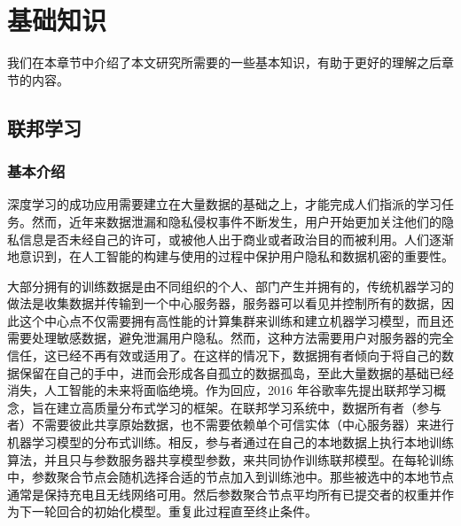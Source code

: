 \chapter{基础知识}
\label{ch2}
我们在本章节中介绍了本文研究所需要的一些基本知识，有助于更好的理解之后章节的内容。

\section{联邦学习}

\subsection{基本介绍}
深度学习的成功应用需要建立在大量数据的基础之上，才能完成人们指派的学习任务。然而，近年来数据泄漏和隐私侵权事件不断发生，用户开始更加关注他们的隐私信息是否未经自己的许可，或被他人出于商业或者政治目的而被利用。人们逐渐地意识到，在人工智能的构建与使用的过程中保护用户隐私和数据机密的重要性。

大部分拥有的训练数据是由不同组织的个人、部门产生并拥有的，传统机器学习的做法是收集数据并传输到一个中心服务器，服务器可以看见并控制所有的数据，因此这个中心点不仅需要拥有高性能的计算集群来训练和建立机器学习模型，而且还需要处理敏感数据，避免泄漏用户隐私。然而，这种方法需要用户对服务器的完全信任，这已经不再有效或适用了。在这样的情况下，数据拥有者倾向于将自己的数据保留在自己的手中，进而会形成各自孤立的数据孤岛，至此大量数据的基础已经消失，人工智能的未来将面临绝境。作为回应，2016 年谷歌\cite{ref25}率先提出联邦学习概念，旨在建立高质量分布式学习的框架。在联邦学习系统中，数据所有者（参与者）不需要彼此共享原始数据，也不需要依赖单个可信实体（中心服务器）来进行机器学习模型的分布式训练。相反，参与者通过在自己的本地数据上执行本地训练算法，并且只与参数服务器共享模型参数，来共同协作训练联邦模型。在每轮训练中，参数聚合节点会随机选择合适的节点加入到训练池中。那些被选中的本地节点通常是保持充电且无线网络可用。然后参数聚合节点平均所有已提交者的权重并作为下一轮回合的初始化模型。重复此过程直至终止条件。

